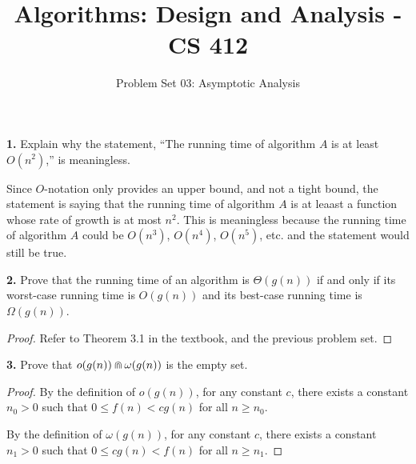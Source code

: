 \documentclass[addpoints]{exam}
\title{Algorithms: Design and Analysis - CS 412 }
\author{Problem Set 03: Asymptotic Analysis}
\date{}
\begin{document}
\maketitle

\begin{questions}
  \question
  \textbf{1. } Explain why the statement, ``The running time of algorithm $A$ is at least $ O(n^2) $,'' is meaningless.
  \begin{solution}
    Since $O$-notation only provides an upper bound, and not a tight bound, the statement is saying that the running time of algorithm $A$ is at leaast a function whose rate of growth is at most $n^2$. This is meaningless because the running time of algorithm $A$ could be $O(n^3)$, $O(n^4)$, $O(n^5)$, etc. and the statement would still be true.
  \end{solution}

  \question
  \textbf{2. } Prove that the running time of an algorithm is $ \Theta(g(n)) $ if and only if its worst-case running time is $ O(g(n)) $ and its best-case running time is $ \Omega(g(n)) $.
  \begin{solution}
    \begin{proof} \vspace*{-4mm}
      Refer to Theorem 3.1 in the textbook, and the previous problem set.
    \end{proof}
  \end{solution}

  \question
  \textbf{3. } Prove that $ o(g(n)) \doublecap \omega(g(n)) $ is the empty set.
  \begin{solution}
    \begin{proof} \vspace*{-4mm}
      By the definition of $o(g(n))$, for any constant $c$, there exists a constant $ n_0 > 0 $ such that $ 0 \leq f(n) < cg(n) $ for all $ n \geq n_0 $.

      By the definition of $ \omega(g(n)) $, for any constant $c$, there exists a constant $ n_1 > 0 $ such that $ 0 \leq cg(n) < f(n) $ for all $ n \geq n_1 $.


\end{proof}
\end{solution}
\end{questions}
\end{document}
